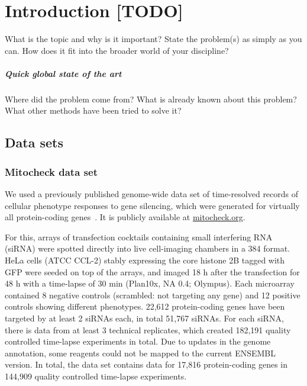 \chapter{Introduction [TODO]}
What is the topic and why is it important? State the problem(s) as simply as you can. How does it fit into the broader world of your discipline? 
\paragraph*{Quick global state of the art}
Where did the problem come from? What is already known about this problem? What other methods have been tried to solve it? 

\section{Data sets}
\subsection{Mitocheck data set}

We used a previously published genome-wide data set of time-resolved
records of cellular phenotype responses to gene silencing, which
were generated for virtually all protein-coding genes~\cite{pmid20360735}. It is publicly available at
\href{http://www.mitocheck.org}{mitocheck.org}. 

For this, arrays of transfection cocktails containing small interfering RNA (siRNA) were spotted directly into live cell-imaging chambers in a 384 format. HeLa cells (ATCC\up{\textregistered} CCL-2\texttrademark) stably expressing the core histone 2B tagged with GFP were seeded on top of the arrays, and imaged 18 h after the transfection for 48 h with a time-lapse of 30 min (Plan10x, NA 0.4; Olympus). Each microarray contained 8 negative controls (scrambled: not targeting any gene) and 12 positive controls showing different phenotypes. 
22,612 protein-coding genes have been targeted by at least 2 siRNAs each, in total 51,767 siRNAs. For each siRNA, there is data from at least 3 technical replicates, which created 182,191 quality controlled time-lapse experiments in total. Due to updates in the genome annotation, some reagents could not be mapped to the current ENSEMBL version. In total, the data set contains data for 17,816 protein-coding genes in 144,909 quality controlled time-lapse
experiments.  

